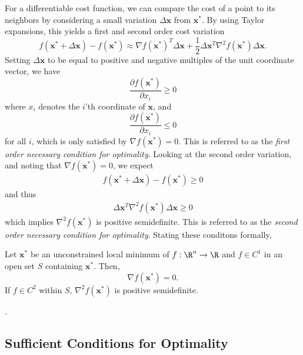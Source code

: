 For a differentiable cost function, we can compare the cost of a point to its neighbors by considering a small variation $\Delta \bm{x}$ from $\bm{x}^*$. By using Taylor expansions, this yields a first and second order cost variation
\begin{equation}
    f(\bm{x}^* + \Delta \bm{x}) - f(\bm{x}^*) \approx \nabla f(\bm{x}^*)^T \Delta \bm{x} + \frac{1}{2} \Delta \bm{x}^T \nabla^2 f(\bm{x}^*) \Delta \bm{x}.
\end{equation}
Setting $\Delta \bm{x}$ to be equal to positive and negative multiples of the unit coordinate vector, we have 
\begin{equation}
    \frac{\partial f(\bm{x}^*)}{\partial x_i} \geq 0
\end{equation}
where $x_i$ denotes the $i$'th coordinate of $\bm{x}$, and 
\begin{equation}
    \frac{\partial f(\bm{x}^*)}{\partial x_i} \leq 0
\end{equation}
for all $i$, which is only satisfied by $\nabla f(\bm{x}^*) = 0$.  This is referred to as the \textit{first order necessary condition for optimality}. Looking at the second order variation, and noting that $\nabla f(\bm{x}^*) = 0$, we expect
\begin{align}
f(\bm{x}^* + \Delta \bm{x}) - f(\bm{x}^*) \geq 0
\end{align}
and thus
\begin{align}
\Delta \bm{x}^T \nabla^2 f(\bm{x}^*) \Delta \bm{x} \geq 0
\end{align}
which implies $\nabla^2 f(\bm{x}^*)$ is positive semidefinite. This is referred to as the \textit{second order necessary condition for optimality}. Stating these conditons formally, 

\begin{theorem}
Let $\bm{x}^*$ be an unconstrained local minimum of $f:\R^n \to \R$ and $f \in C^1$ in an open set $S$ containing $\bm{x}^*$. Then,
\begin{equation}
    \nabla f(\bm{x}^*) = 0.
\end{equation}
If $f \in C^2$ within $S$, $\nabla^2 f(\bm{x}^*)$ is positive semidefinite. 
\end{theorem}

.

\subsection{Sufficient Conditions for Optimality}


